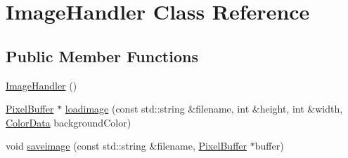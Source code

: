 \hypertarget{classImageHandler}{\section{Image\-Handler Class Reference}
\label{classImageHandler}
}
\subsection*{Public Member Functions}
\begin{DoxyCompactItemize}
\item 
\hyperlink{classImageHandler_a86d8324568727c2799a54a43d7296ddb}{Image\-Handler} ()
\item 
\hyperlink{classPixelBuffer}{Pixel\-Buffer} $\ast$ \hyperlink{classImageHandler_a0042244c7f1462f4ffc2403f139bf286}{loadimage} (const std\-::string \&filename, int \&height, int \&width, \hyperlink{classColorData}{Color\-Data} background\-Color)
\item 
void \hyperlink{classImageHandler_ace874907681fc4970f6a2ae2377833b9}{saveimage} (const std\-::string \&filename, \hyperlink{classPixelBuffer}{Pixel\-Buffer} $\ast$buffer)
\end{DoxyCompactItemize}
